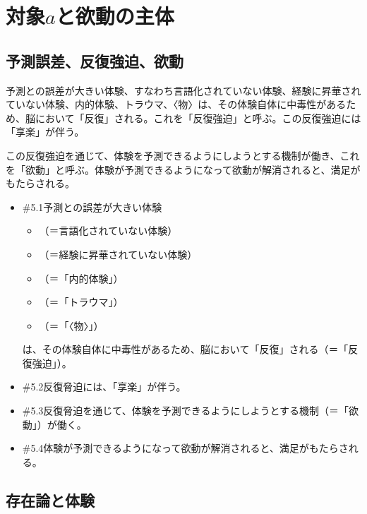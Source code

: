 \section{\texorpdfstring{対象\(a\)と欲動の主体}{対象aと欲動の主体}}\label{ux5bfeux8c61aux3068ux6b32ux52d5ux306eux4e3bux4f53}

\subsection{予測誤差、反復強迫、欲動}\label{ux4e88ux6e2cux8aa4ux5deeux53cdux5fa9ux5f37ux8febux6b32ux52d5}

予測との誤差が大きい体験、すなわち言語化されていない体験、経験に昇華されていない体験、内的体験、トラウマ、〈物〉は、その体験自体に中毒性があるため、脳において「反復」される。これを「反復強迫」と呼ぶ。この反復強迫には「享楽」が伴う。

この反復強迫を通じて、体験を予測できるようにしようとする機制が働き、これを「欲動」と呼ぶ。体験が予測できるようになって欲動が解消されると、満足がもたらされる。

\begin{note}{}
  \begin{itemize}
    \tightlist
    \item{\#5.1}予測との誤差が大きい体験
      \begin{itemize}
        \tightlist
        \item （＝言語化されていない体験）
        \item （＝経験に昇華されていない体験）
        \item （＝「内的体験」）
        \item （＝「トラウマ」）
        \item （＝「〈物〉」）
      \end{itemize}は、その体験自体に中毒性があるため、脳において「反復」される（＝「反復強迫」）。
    \item{\#5.2}反復脅迫には、「享楽」が伴う。
    \item{\#5.3}反復脅迫を通じて、体験を予測できるようにしようとする機制（＝「欲動」）が働く。
    \item{\#5.4}体験が予測できるようになって欲動が解消されると、満足がもたらされる。
  \end{itemize}
\end{note}

\subsection{存在論と体験}\label{ux5b58ux5728ux8ad6ux3068ux4f53ux9a13}

